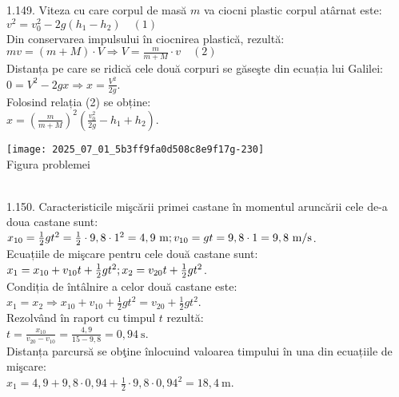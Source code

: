 1.149. Viteza cu care corpul de masă $m$ va ciocni plastic corpul atârnat este:\\ $v^{2}=v_{0}^{2}-2 g\left(h_{1}-h_{2}\right) \quad (1)$\\ Din conservarea impulsului în ciocnirea plastică, rezultă:\\ $m v=(m+M) \cdot V \Rightarrow V=\frac{m}{m+M} \cdot v \quad (2)$\\ Distanța pe care se ridică cele două corpuri se găseşte din ecuația lui Galilei:\\ $0=V^{2}-2 g x \Rightarrow x=\frac{V^{2}}{2 g}$.\\ Folosind relația (2) se obține:\\ $x=\left(\frac{m}{m+M}\right)^{2}\left(\frac{v_{0}^{2}}{2 g}-h_{1}+h_{2}\right)$.\\ \begin{center} \texttt{[image: 2025\_07\_01\_5b3ff9fa0d508c8e9f17g-230]}\\ Figura problemei \end{center}\\

1.150. Caracteristicile mişcării primei castane în momentul aruncării cele de-a doua castane sunt:\\ $x_{10}=\frac{1}{2} g t^{2}=\frac{1}{2} \cdot 9,8 \cdot 1^{2}=4,9 \mathrm{~m};\\ v_{10}=g t=9,8 \cdot 1=9,8 \mathrm{~m} / \mathrm{s}$.\\ Ecuațiile de mişcare pentru cele două castane sunt:\\ $x_{1}=x_{10}+v_{10} t+\frac{1}{2} g t^{2};\\ x_{2}=v_{20} t+\frac{1}{2} g t^{2}$.\\ Condiția de întâlnire a celor două castane este:\\ $x_{1}=x_{2} \Rightarrow x_{10}+v_{10}+\frac{1}{2} g t^{2}=v_{20}+\frac{1}{2} g t^{2}$.\\ Rezolvând în raport cu timpul $t$ rezultă:\\ $t=\frac{x_{10}}{v_{20}-v_{10}}=\frac{4,9}{15-9,8}=0,94 \mathrm{~s}$.\\ Distanța parcursă se obţine înlocuind valoarea timpului în una din ecuațiile de mişcare:\\ $x_{1}=4,9+9,8 \cdot 0,94+\frac{1}{2} \cdot 9,8 \cdot 0,94^{2}=18,4 \mathrm{~m}$.\\

